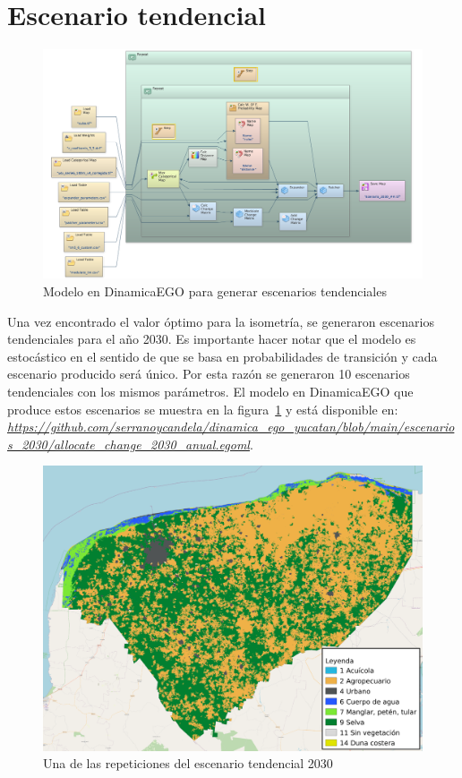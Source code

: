 \documentclass[12pt,a4paper,oldfontcommands]{article}
\begin{document}
\section{Escenario tendencial}
\begin{figure}[H]
	\centering
	\includegraphics[width=1\textwidth]{./figuras/modelo_escenarios.png}
	\caption{Modelo en DinamicaEGO para generar escenarios tendenciales}
	\label{fig:modelo_escenarios}
\end{figure}
Una vez encontrado el valor óptimo para la isometría, se generaron escenarios tendenciales para el año 2030. Es importante hacer notar que el modelo es estocástico en el sentido de que se basa en probabilidades de transición y cada escenario producido será único. Por esta razón se generaron 10 escenarios tendenciales con los mismos parámetros. El modelo en DinamicaEGO que produce estos escenarios se muestra en la figura~\ref{fig:modelo_escenarios} y está disponible en: \textit{\url{https://github.com/serranoycandela/dinamica_ego_yucatan/blob/main/escenarios_2030/allocate_change_2030_anual.egoml}}.

\begin{figure}[H]
	\centering
	\includegraphics[width=1\textwidth]{./figuras/escenario_2030.png}
	\caption{Una de las repeticiones del escenario tendencial 2030}
	\label{fig:escenario_2030}
\end{figure}
\end{document}
